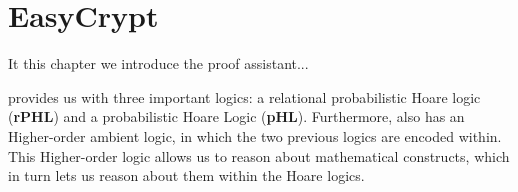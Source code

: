 \section{EasyCrypt}
\label{sec:EasyCrypt}

It this chapter we introduce the \easycrypt proof assistant...

\easycrypt provides us with three important logics: a relational probabilistic
Hoare logic (\textbf{rPHL}) and a probabilistic Hoare Logic (\textbf{pHL}).
Furthermore, \easycrypt also has an Higher-order ambient logic, in which the two
previous logics are encoded within. This Higher-order logic allows us to reason
about mathematical constructs, which in turn lets us reason about them within
the Hoare logics.



